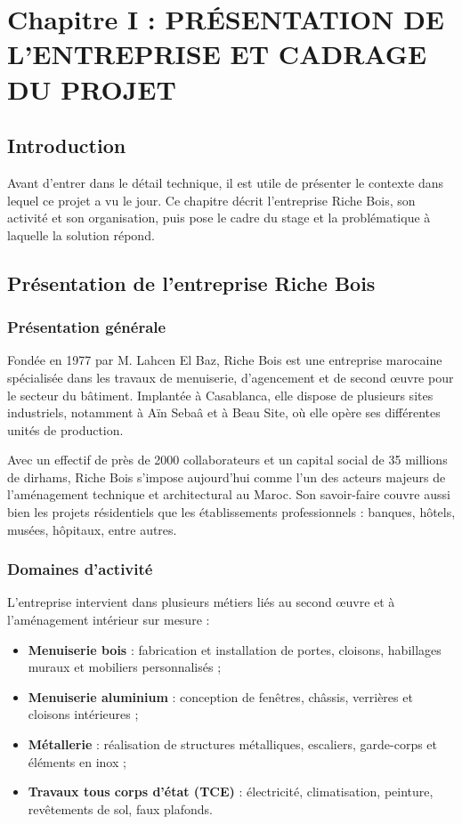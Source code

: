 \documentclass[12pt,a4paper]{report}
\begin{document}
\chapter{ Chapitre I : PRÉSENTATION DE L'ENTREPRISE ET CADRAGE DU PROJET}

\section{Introduction}

Avant d'entrer dans le détail technique, il est utile de présenter le contexte dans lequel ce projet a vu le jour. Ce chapitre décrit l'entreprise Riche Bois, son activité et son organisation, puis pose le cadre du stage et la problématique à laquelle la solution répond.

\section{Présentation de l'entreprise Riche Bois}

\subsection{Présentation générale}

Fondée en 1977 par M. Lahcen El Baz, Riche Bois est une entreprise marocaine spécialisée dans les travaux de menuiserie, d'agencement et de second œuvre pour le secteur du bâtiment. Implantée à Casablanca, elle dispose de plusieurs sites industriels, notamment à Aïn Sebaâ et à Beau Site, où elle opère ses différentes unités de production.

Avec un effectif de près de 2000 collaborateurs et un capital social de 35 millions de dirhams, Riche Bois s'impose aujourd'hui comme l'un des acteurs majeurs de l'aménagement technique et architectural au Maroc. Son savoir-faire couvre aussi bien les projets résidentiels que les établissements professionnels : banques, hôtels, musées, hôpitaux, entre autres.

\subsection{Domaines d'activité}

L'entreprise intervient dans plusieurs métiers liés au second œuvre et à l'aménagement intérieur sur mesure :

\begin{itemize}
\item \textbf{Menuiserie bois} : fabrication et installation de portes, cloisons, habillages muraux et mobiliers personnalisés ;
\item \textbf{Menuiserie aluminium} : conception de fenêtres, châssis, verrières et cloisons intérieures ;
\item \textbf{Métallerie} : réalisation de structures métalliques, escaliers, garde-corps et éléments en inox ;
\item \textbf{Travaux tous corps d'état (TCE)} : électricité, climatisation, peinture, revêtements de sol, faux plafonds.
\end{itemize}
\end{document}
